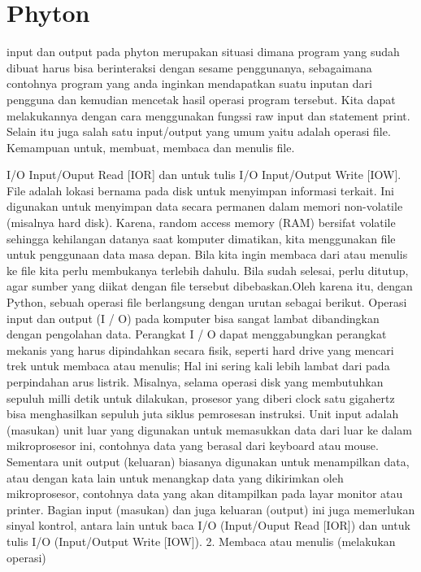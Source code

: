 \section{Phyton}

input dan output pada phyton merupakan
situasi dimana program yang sudah dibuat harus bisa berinteraksi dengan sesame penggunanya,
sebagaimana contohnya program yang anda inginkan mendapatkan suatu inputan dari
pengguna dan kemudian mencetak hasil operasi program tersebut. Kita dapat
melakukannya dengan cara menggunakan fungssi raw input dan statement print. Selain
itu juga salah satu input/output yang umum yaitu adalah operasi file. Kemampuan
untuk, membuat, membaca dan menulis file.

I/O Input/Ouput Read [IOR] dan untuk tulis I/O Input/Output Write [IOW]. File adalah lokasi bernama pada disk untuk menyimpan informasi terkait. Ini digunakan untuk menyimpan data secara permanen dalam memori non-volatile (misalnya hard disk). Karena, random access memory (RAM) bersifat volatile sehingga kehilangan datanya saat komputer dimatikan, kita menggunakan file untuk penggunaan data masa depan. Bila kita ingin membaca dari atau menulis ke file kita perlu membukanya terlebih dahulu. Bila sudah selesai, perlu ditutup, agar sumber yang diikat dengan file tersebut dibebaskan.Oleh karena itu, dengan Python, sebuah operasi file berlangsung dengan urutan sebagai berikut. 
Operasi input dan output (I / O) pada komputer bisa sangat lambat dibandingkan dengan pengolahan data. Perangkat I / O dapat menggabungkan perangkat mekanis yang harus dipindahkan secara fisik, seperti hard drive yang mencari trek untuk membaca atau menulis; Hal ini sering kali  lebih lambat dari pada perpindahan arus listrik. Misalnya, selama operasi disk yang membutuhkan sepuluh milli detik untuk dilakukan, prosesor yang diberi clock satu gigahertz bisa menghasilkan sepuluh juta siklus pemrosesan instruksi. 
Unit input adalah (masukan) unit luar yang digunakan untuk memasukkan data dari luar ke dalam mikroprosesor ini, contohnya data yang berasal dari keyboard atau mouse. Sementara unit output (keluaran) biasanya digunakan untuk menampilkan data, atau dengan kata lain untuk menangkap data yang dikirimkan oleh mikroprosesor, contohnya data yang akan ditampilkan pada layar monitor atau printer.
Bagian input (masukan) dan juga keluaran (output) ini juga memerlukan sinyal kontrol, antara lain untuk baca I/O (Input/Ouput Read [IOR]) dan untuk tulis I/O (Input/Output Write [IOW]).  
2. \hspace*{0.5in} Membaca atau menulis (melakukan operasi)  
